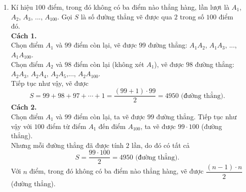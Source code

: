 \begin{vd}
{\begin{enumerate}
\begin{enumEX}{3}
			\end{enumEX}
			\item Kí hiệu $100$ điểm, trong đó không có ba điểm nào thẳng hàng, lần lượt là $A_1$, $A_2$, $A_3$, ..., $A_{100}$. Gọi $S$ là số đường thẳng vẽ được qua $2$ trong số $100$ điểm đó.\\
			\textbf{Cách 1.\\}
			Chọn điểm $A_1$ và $99$ điểm còn lại, vẽ được $99$ đường thẳng: $A_1A_2$, $A_1A_3$, ..., $A_1A_{100}$.\\
			Chọn điểm $A_2$ và $98$ điểm còn lại (không xét $A_1$), vẽ được $98$ đường thẳng: $A_2A_3$, $A_2A_4$, $A_2A_5$,..., $A_2A_{100}$.\\
			Tiếp tục như vậy, vẽ được
			\[S=99+98+97+\cdots+1=\dfrac{(99+1) \cdot 99}{2}=4950 \text{ (đường thẳng)}.\]
			\textbf{Cách 2.\\}
			Chọn điểm $A_1$ và $99$ điểm còn lại, ta vẽ được $99$ đường thẳng. Tiếp tục như vậy với $100$ điểm từ điểm $A_1$ đến điểm $A_{100}$, ta vẽ được $99 \cdot 100$ (đường thẳng).\\
			Nhưng mỗi đường thẳng đã được tính $2$ lần, do đó có tất cả
			\[S=\dfrac{99 \cdot 100}{2} = 4950 \text{ (đường thẳng)}.\]
			Với $n$ điểm, trong đó không có ba điểm nào thẳng hàng, vẽ được $\dfrac{(n-1)\cdot n}{2}$ (đường thẳng).
		\end{enumerate}
	}
\end{vd}

